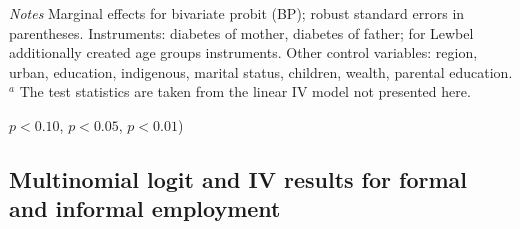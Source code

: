 \begin{table}[ph]
\begin{center}
\begin{adjustbox}{max width=\textwidth, center}
\begin{threeparttable}
{\begin{tabular}{l*{4}{S S}}
\end{tabular}
\begin{tablenotes}
\item \textit{Notes}  Marginal effects for bivariate probit (BP); robust standard errors in parentheses. Instruments: diabetes of mother, diabetes of father; for Lewbel additionally created age groups instruments. Other control variables: region, urban, education, indigenous, marital status, children, wealth, parental education. $^a$ The test statistics are taken from the linear IV model not presented here.
\item \sym{*} \(p<0.10\), \sym{**} \(p<0.05\), \sym{***} \(p<0.01\))
\end{tablenotes}
}
\end{threeparttable} 
\end{adjustbox}
\end{center}
\end{table}


\clearpage


\subsection*{Multinomial logit and IV results for formal and informal employment}


